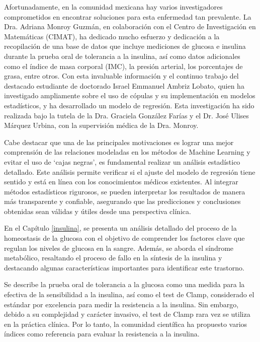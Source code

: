 Afortunadamente, en la comunidad mexicana hay varios investigadores comprometidos en encontrar soluciones para esta enfermedad tan prevalente. La Dra. Adriana Monroy Guzmán, en colaboración con el Centro de Investigación en Matemáticas (CIMAT), ha dedicado mucho esfuerzo y dedicación a la recopilación de una base de datos que incluye mediciones de glucosa e insulina durante la prueba oral de tolerancia a la insulina, así como datos adicionales como el índice de masa corporal (IMC), la presión arterial, los porcentajes de grasa, entre otros. Con esta invaluable información y el continuo trabajo del destacado estudiante de doctorado Israel Emmanuel Ambriz Lobato, quien ha investigado ampliamente sobre el uso de cópulas y su implementación en modelos estadísticos, y ha desarrollado un modelo de regresión. Esta investigación ha sido realizada bajo la tutela de la Dra. Graciela González Farías y el Dr. José Ulises Márquez Urbina, con la supervisión médica de la Dra. Monroy.

Cabe destacar que una de las principales motivaciones es lograr una mejor comprensión de las relaciones modeladas en los métodos de Machine Learning y evitar el uso de `cajas negras', es fundamental realizar un análisis estadístico detallado. Este análisis permite verificar si el ajuste del modelo de regresión tiene sentido y está en línea con los conocimientos médicos existentes. Al integrar métodos estadísticos rigurosos, se pueden interpretar los resultados de manera más transparente y confiable, asegurando que las predicciones y conclusiones obtenidas sean válidas y útiles desde una perspectiva clínica.

En el Capítulo \ref{insulina}, se presenta un análisis detallado del proceso de la homeostasis de la glucosa con el objetivo de comprender los factores clave que regulan los niveles de glucosa en la sangre. Además, se aborda el síndrome metabólico, resaltando el proceso de fallo en la síntesis de la insulina y destacando algunas características importantes para identificar este trastorno.

Se describe la prueba oral de tolerancia a la glucosa como una medida para la efectiva de la sensibilidad a la insulina, así como el test de Clamp, considerado el estándar por excelencia para medir la resistencia a la insulina. Sin embargo, debido a su complejidad y carácter invasivo, el test de Clamp rara vez se utiliza en la práctica clínica. Por lo tanto, la comunidad científica ha propuesto varios índices como referencia para evaluar la resistencia a la insulina.

